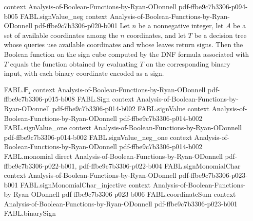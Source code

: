 \begin{theorem}
  {context}
  {Analysis-of-Boolean-Functions-by-Ryan-ODonnell}
  {pdf-ffbe9c7b3306-p094-b005}
\proofstep
  {FABL.signValue_neg}
  {context}
  {Analysis-of-Boolean-Functions-by-Ryan-ODonnell}
  {pdf-ffbe9c7b3306-p020-b001}
Let $n$ be a nonnegative integer, let $A$ be a set of available coordinates among the
$n$ coordinates, and let $T$ be a decision tree whose queries use available coordinates
and whose leaves return signs. Then the Boolean function on the sign cube computed by
the DNF formula associated with $T$ equals the function obtained by evaluating $T$ on
the corresponding binary input, with each binary coordinate encoded as a sign.
\end{theorem}

\begin{theorem}
\leanok
{}
\proofstep
  {FABL.𝔽₂}
  {context}
  {Analysis-of-Boolean-Functions-by-Ryan-ODonnell}
  {pdf-ffbe9c7b3306-p015-b008}
\proofstep
  {FABL.Sign}
  {context}
  {Analysis-of-Boolean-Functions-by-Ryan-ODonnell}
  {pdf-ffbe9c7b3306-p014-b002}
\proofstep
  {FABL.signValue}
  {context}
  {Analysis-of-Boolean-Functions-by-Ryan-ODonnell}
  {pdf-ffbe9c7b3306-p014-b002}
\proofstep
  {FABL.signValue_one}
  {context}
  {Analysis-of-Boolean-Functions-by-Ryan-ODonnell}
  {pdf-ffbe9c7b3306-p014-b002}
\proofstep
  {FABL.signValue_neg_one}
  {context}
  {Analysis-of-Boolean-Functions-by-Ryan-ODonnell}
  {pdf-ffbe9c7b3306-p014-b002}
\proofstep
  {FABL.monomial}
  {direct}
  {Analysis-of-Boolean-Functions-by-Ryan-ODonnell}
  {pdf-ffbe9c7b3306-p022-b001,
    pdf-ffbe9c7b3306-p022-b004}
\proofstep
  {FABL.signMonomialChar}
  {context}
  {Analysis-of-Boolean-Functions-by-Ryan-ODonnell}
  {pdf-ffbe9c7b3306-p023-b001}
\proofstep
  {FABL.signMonomialChar_injective}
  {context}
  {Analysis-of-Boolean-Functions-by-Ryan-ODonnell}
  {pdf-ffbe9c7b3306-p023-b006}
\proofstep
  {FABL.coordinateSum}
  {context}
  {Analysis-of-Boolean-Functions-by-Ryan-ODonnell}
  {pdf-ffbe9c7b3306-p023-b001}
\proofstep
  {FABL.binarySign}

\end{theorem}
